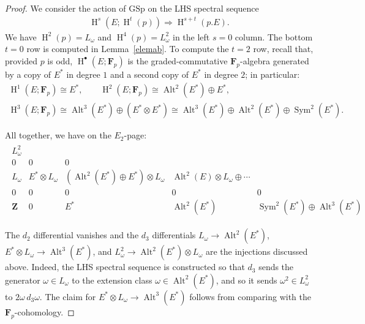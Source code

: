 \documentclass[pdftex]{sigma}
\numberwithin{equation}{section}
\newcommand\bF{\mathbf F}
\newcommand\bZ{\mathbf Z}
\DeclareMathOperator\homology{H}
\renewcommand\H{\homology}
\newcommand\<\langle
\renewcommand\>\rangle
\DeclareMathOperator\Sym{Sym}
\DeclareMathOperator\Alt{Alt}
\newcommand{\GSp}{\mathrm{GSp}}
\begin{document}
\begin{proof}We consider the action of $\GSp$ on the LHS spectral sequence
\begin{gather*}
\H^s(E;\H^t(p)) \Rightarrow \H^{s+t}(p.E).
\end{gather*}
We have $\H^2(p) = L_{\omega}$ and $\H^4(p) = L_{\omega}^{2}$ in the left $s = 0$ column. The bottom $t = 0$ row is computed in Lemma~\ref{elemab}.
To compute the $t=2$ row, recall that, provided $p$ is odd, $\H^\bullet(E;\bF_p)$ is the graded-commutative $\bF_p$-algebra generated by a copy of $E^*$ in degree $1$ and a second copy of $E^*$ in degree $2$; in particular:
\begin{gather*}
 \H^1(E;\bF_p) \cong E^*, \qquad \H^2(E;\bF_p) \cong \Alt^2(E^*) \oplus E^*, \\ \H^3(E;\bF_p) \cong \Alt^3(E^*) \oplus (E^* \otimes E^*) \cong \Alt^3(E^*) \oplus \Alt^2(E^*) \oplus \Sym^2(E^*). \end{gather*}

All together, we have on the $E_2$-page:
\begin{gather*}
\begin{array}{ccccc}
L_{\omega}^{2} \\
0 & 0 & 0 \\
L_{\omega} & E^* \otimes L_{\omega} & (\Alt^2(E^*) \oplus E^*) \otimes L_{\omega} & \Alt^2(E) \otimes L_\omega \oplus \cdots \\
0 & 0 & 0 & 0 & 0 \\
\bZ & 0 & E^* & \Alt^2(E^*) & \Sym^2(E^*) \oplus \Alt^3(E^*)
\end{array}
\end{gather*}

The $d_2$ differential vanishes and the $d_3$ differentials $L_\omega \to \Alt^2(E^*)$, $E^* \otimes L_{\omega} \to \Alt^3(E^*)$, and $L_{\omega}^{2} \to \Alt^2(E^*) \otimes L_\omega$ are the injections discussed above. Indeed, the LHS spectral sequence is constructed so that $d_3$ sends the generator $\omega \in L_\omega$ to the extension class $\omega \in \Alt^2(E^*)$, and so it sends $\omega^2 \in L_\omega^2$ to $2\omega \,d_3\omega$. The claim for $E^* \otimes L_{\omega} \to \Alt^3(E^*)$ follows from comparing with the $\bF_p$-cohomology.


\end{proof}
\end{document}
